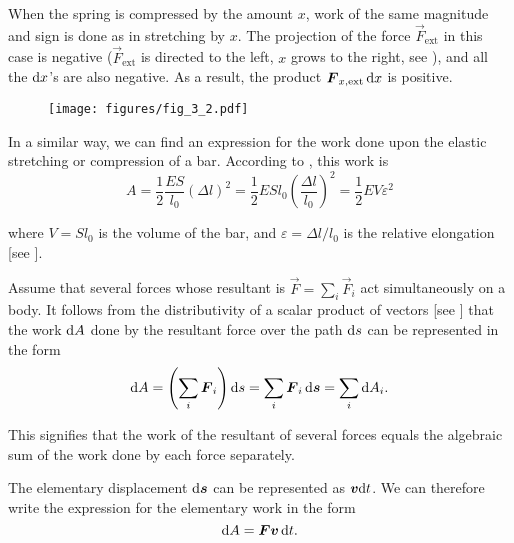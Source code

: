 \noindent
When the spring is compressed by the amount $x$, work of the same magnitude and sign is done as in stretching by $x$. The projection of the force $\vec{F}_{\text{ext}}$ in this case is negative ($\vec{F}_{\text{ext}}$ is directed to the left, $x$ grows to the right, see ), and all the $\mathrm{d} x$'s are also negative. As a result, the product $\boldsymbol{F}_{x,\text{ext}}\,\mathrm{d} x$ is positive.

\begin{figure}[t]
	\begin{center}
		\texttt{[image: figures/fig\_3\_2.pdf]}
		\caption[]{}
		\label{fig:3_2}
	\end{center}
	\vspace{-0.7cm}
\end{figure}

In a similar way, we can find an expression for the work done upon the elastic stretching or compression of a bar. According to , this work is
\begin{equation}\label{eq:3_14}
A = \frac{1}{2}\frac{ES}{l_0}(\Delta l)^2 = \frac{1}{2}ESl_0\left(\frac{\Delta l}{l_0}\right)^2 = \frac{1}{2}EV\varepsilon^2
\end{equation}

\noindent
where $V=Sl_0$ is the volume of the bar, and $\varepsilon=\Delta l/l_0$ is the relative elongation [see ].

Assume that several forces whose resultant is $\vec{F}=\sum_{i}\vec{F}_i$ act simultaneously on a body. It follows from the distributivity of a scalar product of vectors [see ] that the work $\mathrm{d} A$ done by the resultant force over the path $\mathrm{d} s$ can be represented in the form
\begin{equation}\label{eq:3_15}
\mathrm{d} A = \left(\sum_{i}\boldsymbol{F}_i\right)\mathrm{d} s = \sum_{i}\boldsymbol{F}_i\,\mathrm{d}\boldsymbol{s} = \sum_{i}\mathrm{d} A_i.
\end{equation}

\noindent
This signifies that the work of the resultant of several forces equals the algebraic sum of the work done by each force separately.

The elementary displacement $\mathrm{d}\boldsymbol{s}$ can be represented as $\boldsymbol{v}\mathrm{d} t$. We can therefore write the expression for the elementary work in the form
\begin{equation}\label{eq:3_16}
\mathrm{d} A = \boldsymbol{F}\boldsymbol{v}\,\mathrm{d} t.
\end{equation}

